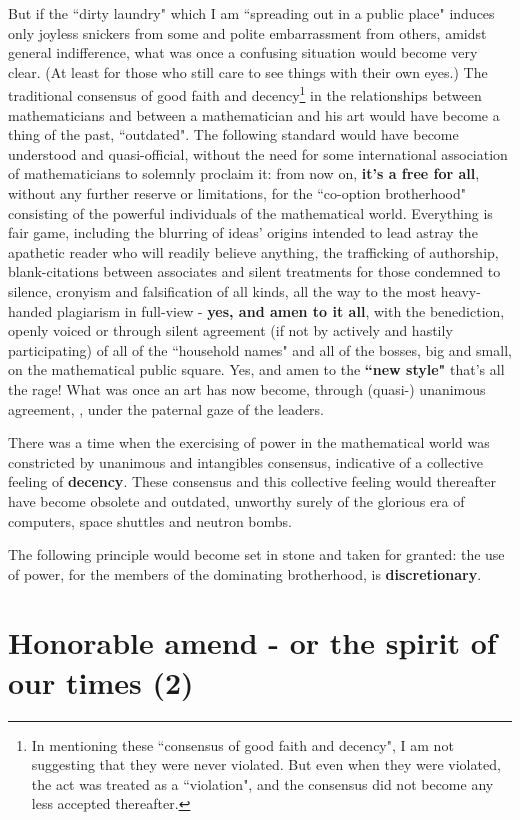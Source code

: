 But if the ``dirty laundry" which I am ``spreading out in a public place" induces only joyless snickers from some and polite embarrassment from others, amidst general indifference, what was once a confusing situation would become very clear. (At least for those who still care to see things with their own eyes.) The traditional consensus of good faith and decency\footnote{In mentioning these ``consensus of good faith and decency", I am not suggesting that they were never violated. But even when they were violated, the act was treated as a ``violation", and the consensus did not become any less accepted thereafter.} in the relationships between mathematicians and between a mathematician and his art would have become a thing of the past, ``outdated". The following standard would have become understood and quasi-official, without the need for some international association of mathematicians to solemnly proclaim it: from now on, \textbf{it's a free for all}, without any further reserve or limitations, for the ``co-option brotherhood" consisting of the powerful individuals of the mathematical world. Everything is fair game, including the blurring of ideas' origins intended to lead astray the apathetic reader who will readily believe anything, the trafficking of authorship, blank-citations between associates and silent treatments for those condemned to silence, cronyism and falsification of all kinds, all the way to the most heavy-handed plagiarism in full-view - \textbf{yes, and amen to it all}, with the benediction, openly voiced or through silent agreement (if not by actively and hastily participating) of all of the ``household names" and all of the bosses, big and small, on the mathematical public square. Yes, and amen to the \textbf{``new style"} that's all the rage! What was once an art has now become, through (quasi-) unanimous agreement, , 
under the paternal gaze of the leaders.

There was a time when the exercising of power in the mathematical world was constricted by unanimous and intangibles consensus, indicative of a collective feeling of \textbf{decency}. These consensus and this collective feeling would thereafter have become obsolete and outdated, unworthy surely of the glorious era of computers, space shuttles and neutron bombs.

The following principle would become set in stone and taken for granted: the use of power, for the members of the dominating brotherhood, is \textbf{discretionary}.

\section{Honorable amend - or the spirit of our times (2)}


